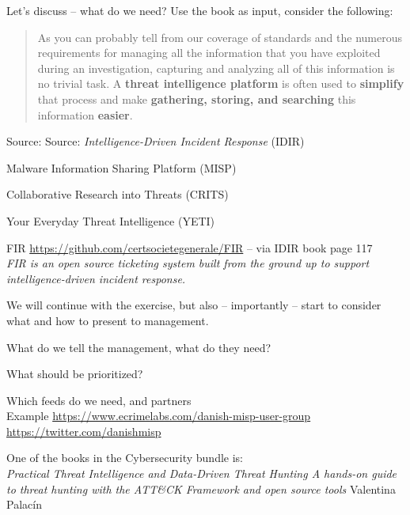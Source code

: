 \documentclass[Screen16to9,17pt]{foils}
\begin{document}

Let's discuss -- what do we need? Use the book as input, consider the following:

\begin{quote}
As you can probably tell from our coverage of standards and the numerous requirements for managing all the information that you have exploited during an investigation, capturing and analyzing all of this information is no trivial task. A {\bf threat intelligence platform} is often used to {\bf simplify} that process and make {\bf gathering, storing, and searching} this information {\bf easier}.
\end{quote}
Source: Source: \emph{Intelligence-Driven Incident Response} (IDIR)


\begin{list2}
\item Malware Information Sharing Platform (MISP)
\item Collaborative Research into Threats (CRITS)
\item Your Everyday Threat Intelligence (YETI)
\item FIR \url{https://github.com/certsocietegenerale/FIR} -- via IDIR book page 117\\
\emph{FIR is an open source ticketing system built from the
ground up to support intelligence-driven incident response.}
\end{list2}




We will continue with the exercise, but also -- importantly -- start to consider what and how to present to management.

\begin{list2}
\item What do we tell the management, what do they need?
\item What should be prioritized?
\item Which feeds do we need, and partners\\
Example \url{https://www.ecrimelabs.com/danish-misp-user-group} \url{https://twitter.com/danishmisp}
\end{list2}



One of the books in the Cybersecurity bundle is:\\
\emph{Practical Threat Intelligence and Data-Driven Threat Hunting A hands-on guide to threat hunting with the
ATT\&CK Framework and open source tools} Valentina Palacín
\end{document}
